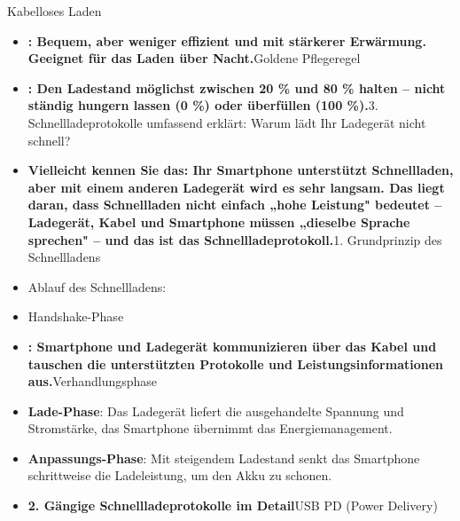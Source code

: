 


Kabelloses Laden

\begin{itemize}
  \item \textbf{: Bequem, aber weniger effizient und mit stärkerer Erwärmung. Geeignet für das Laden über Nacht.}Goldene Pflegeregel
  \item \textbf{: Den Ladestand möglichst zwischen 20 \% und 80 \% halten – nicht ständig hungern lassen (0 \%) oder überfüllen (100 \%).}3. Schnellladeprotokolle umfassend erklärt: Warum lädt Ihr Ladegerät nicht schnell?
  \item \textbf{Vielleicht kennen Sie das: Ihr Smartphone unterstützt Schnellladen, aber mit einem anderen Ladegerät wird es sehr langsam. Das liegt daran, dass Schnellladen nicht einfach „hohe Leistung" bedeutet – Ladegerät, Kabel und Smartphone müssen „dieselbe Sprache sprechen" – und das ist das Schnellladeprotokoll.}1. Grundprinzip des Schnellladens
\end{itemize}


\begin{itemize}
  \item Ablauf des Schnellladens:
  \item Handshake-Phase
  \item \textbf{: Smartphone und Ladegerät kommunizieren über das Kabel und tauschen die unterstützten Protokolle und Leistungsinformationen aus.}Verhandlungsphase
\end{itemize}


\begin{itemize}
  \item \textbf{Lade-Phase}: Das Ladegerät liefert die ausgehandelte Spannung und Stromstärke, das Smartphone übernimmt das Energiemanagement.
  \item \textbf{Anpassungs-Phase}: Mit steigendem Ladestand senkt das Smartphone schrittweise die Ladeleistung, um den Akku zu schonen.
  \item \textbf{2. Gängige Schnellladeprotokolle im Detail}USB PD (Power Delivery)
\end{itemize}

